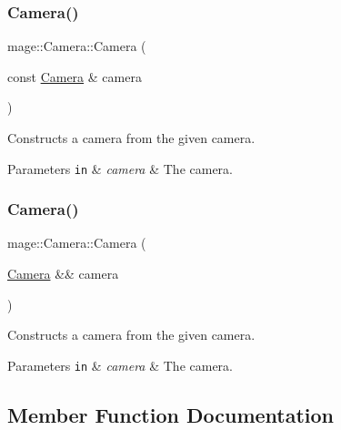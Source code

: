 \subsubsection{\texorpdfstring{Camera()}{Camera()}\hspace{0.1cm}{\footnotesize\ttfamily [2/3]}}
{\footnotesize\ttfamily mage\+::\+Camera\+::\+Camera (\begin{DoxyParamCaption}\item[{const \hyperlink{classmage_1_1_camera}{Camera} \&}]{camera }\end{DoxyParamCaption})\hspace{0.3cm}{\ttfamily [protected]}}

Constructs a camera from the given camera.


\begin{DoxyParams}[1]{Parameters}
\mbox{\tt in}  & {\em camera} & The camera. \\
\hline
\end{DoxyParams}
\hypertarget{classmage_1_1_camera_a4dc6f31c108b28abe9580ef6d7a06713}{}\label{classmage_1_1_camera_a4dc6f31c108b28abe9580ef6d7a06713} 
\subsubsection{\texorpdfstring{Camera()}{Camera()}\hspace{0.1cm}{\footnotesize\ttfamily [3/3]}}
{\footnotesize\ttfamily mage\+::\+Camera\+::\+Camera (\begin{DoxyParamCaption}\item[{\hyperlink{classmage_1_1_camera}{Camera} \&\&}]{camera }\end{DoxyParamCaption})\hspace{0.3cm}{\ttfamily [protected]}}

Constructs a camera from the given camera.


\begin{DoxyParams}[1]{Parameters}
\mbox{\tt in}  & {\em camera} & The camera. \\
\hline
\end{DoxyParams}


\subsection{Member Function Documentation}
\hypertarget{classmage_1_1_camera_a19301c2256c183db50b5e9406f7b5f3c}{}\label{classmage_1_1_camera_a19301c2256c183db50b5e9406f7b5f3c} 

